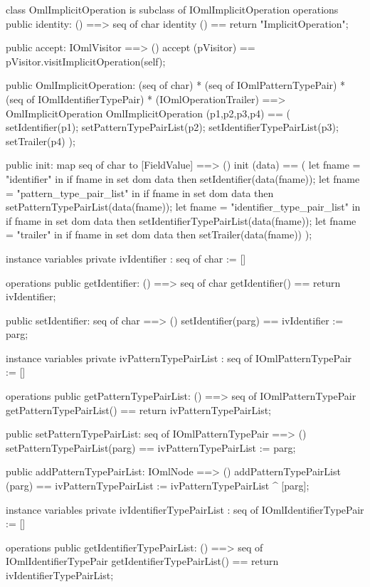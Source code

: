\begin{vdm_al}
class OmlImplicitOperation is subclass of IOmlImplicitOperation
operations
  public identity: () ==> seq of char
  identity () == return "ImplicitOperation";

  public accept: IOmlVisitor ==> ()
  accept (pVisitor) == pVisitor.visitImplicitOperation(self);

  public OmlImplicitOperation:
      (seq of char) *
      (seq of IOmlPatternTypePair) *
      (seq of IOmlIdentifierTypePair) *
      (IOmlOperationTrailer) ==> OmlImplicitOperation
  OmlImplicitOperation (p1,p2,p3,p4) == 
   ( setIdentifier(p1);
     setPatternTypePairList(p2);
     setIdentifierTypePairList(p3);
     setTrailer(p4) );

  public init: map seq of char to [FieldValue] ==> ()
  init (data) ==
    ( let fname = "identifier" in
        if fname in set dom data
        then setIdentifier(data(fname));
      let fname = "pattern_type_pair_list" in
        if fname in set dom data
        then setPatternTypePairList(data(fname));
      let fname = "identifier_type_pair_list" in
        if fname in set dom data
        then setIdentifierTypePairList(data(fname));
      let fname = "trailer" in
        if fname in set dom data
        then setTrailer(data(fname)) );

instance variables
  private ivIdentifier : seq of char := []

operations
  public getIdentifier: () ==> seq of char
  getIdentifier() == return ivIdentifier;

  public setIdentifier: seq of char ==> ()
  setIdentifier(parg) == ivIdentifier := parg;

instance variables
  private ivPatternTypePairList : seq of IOmlPatternTypePair := []

operations
  public getPatternTypePairList: () ==> seq of IOmlPatternTypePair
  getPatternTypePairList() == return ivPatternTypePairList;

  public setPatternTypePairList: seq of IOmlPatternTypePair ==> ()
  setPatternTypePairList(parg) == ivPatternTypePairList := parg;

  public addPatternTypePairList: IOmlNode ==> ()
  addPatternTypePairList (parg) == ivPatternTypePairList := ivPatternTypePairList ^ [parg];

instance variables
  private ivIdentifierTypePairList : seq of IOmlIdentifierTypePair := []

operations
  public getIdentifierTypePairList: () ==> seq of IOmlIdentifierTypePair
  getIdentifierTypePairList() == return ivIdentifierTypePairList;


\end{vdm_al}
